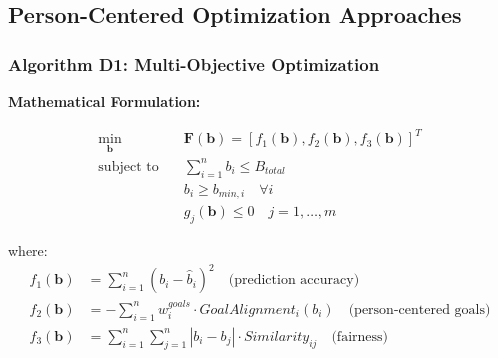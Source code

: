 \subsection{Person-Centered Optimization Approaches}

\subsubsection{Algorithm D1: Multi-Objective Optimization}

\textbf{Mathematical Formulation:}

\begin{align}
\min_{\mathbf{b}} \quad & \mathbf{F}(\mathbf{b}) = [f_1(\mathbf{b}), f_2(\mathbf{b}), f_3(\mathbf{b})]^T \\
\text{subject to} \quad & \sum_{i=1}^n b_i \leq B_{total} \\
& b_i \geq b_{min,i} \quad \forall i \\
& g_j(\mathbf{b}) \leq 0 \quad j = 1, \ldots, m
\end{align}

where:
\begin{align}
f_1(\mathbf{b}) &= \sum_{i=1}^n (b_i - \hat{b}_i)^2 \quad \text{(prediction accuracy)} \\
f_2(\mathbf{b}) &= -\sum_{i=1}^n w_i^{goals} \cdot GoalAlignment_i(b_i) \quad \text{(person-centered goals)} \\
f_3(\mathbf{b}) &= \sum_{i=1}^n \sum_{j=1}^n |b_i - b_j| \cdot Similarity_{ij} \quad \text{(fairness)}
\end{align}

